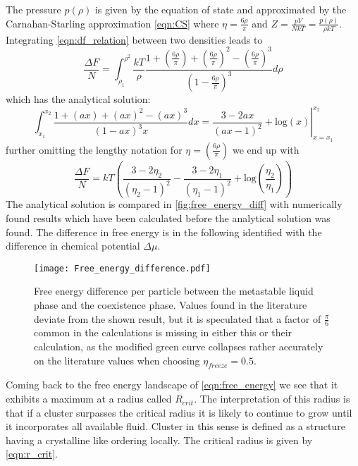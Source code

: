 The pressure $p(\rho)$ is given by the equation of state and approximated by the Carnahan-Starling approximation \autoref{eqn:CS} where $\eta = \frac{6 \rho }{\pi}$ and $Z=\frac{pV}{NkT} = \frac{p(\rho)}{\rho kT}$. Integrating \autoref{eqn:df_relation} between two densities leads to
\begin{equation}
\frac{\Delta F}{N} = \int_{\rho_1}^{\rho^2} \frac{kT}{\rho} \frac{1+\left( \frac{6 \rho}{\pi}\right) +\left( \frac{6 \rho}{\pi}\right)^2 - \left( \frac{6 \rho}{\pi}\right)^3}{\left( 1 - \frac{6 \rho}{\pi}\right)^3} d\rho
\end{equation}
which has the analytical solution:
\begin{equation}
\int_{x_1}^{x_2} \frac{1+(ax) +(ax)^2 - (ax)^3 }{( 1 - ax )^3 x} dx = \left. \frac{3-2ax}{(ax-1)^2} + \text{log}(x) \right|_{x=x_1}^{x_2}
\end{equation}
further omitting the lengthy notation for $\eta = \left( \frac{6 \rho}{\pi}\right)$ we end up with
\begin{equation}
\frac{\Delta F}{N} = kT \left(  \frac{3-2 \eta_2}{(\eta_2 - 1)^2} - \frac{3-2 \eta_1}{(\eta_1 - 1)^2} + \text{log}\left( \frac{\eta_2}{\eta_1} \right) \right)
\end{equation}
The analytical solution is compared in \autoref{fig:free_energy_diff} with numerically found results which have been calculated before the analytical solution was found. The difference in free energy is in the following identified with the difference in chemical potential $\Delta \mu$. \\

\begin{figure}[h]
\centering
\texttt{[image: Free\_energy\_difference.pdf]}
\caption{Free energy difference per particle between the metastable liquid phase and the coexistence phase. Values found in the literature deviate from the shown result, but it is speculated that a factor of $\frac{\pi}{6}$ common in the calculations is missing in either this or their calculation, as the modified green curve collapses rather accurately on the literature values when choosing $\eta_{freeze}=0.5$.}
\label{fig:free_energy_diff}
\end{figure}


Coming back to the free energy landscape of \autoref{eqn:free_energy} we see that it exhibits a maximum at a radius called $R_{crit}$. The interpretation of this radius is that if a cluster surpasses the critical radius it is likely to continue to grow until it incorporates all available fluid. Cluster in this sense is defined as a structure having a crystalline like ordering locally. The critical radius is given by \autoref{eqn:r_crit}.

